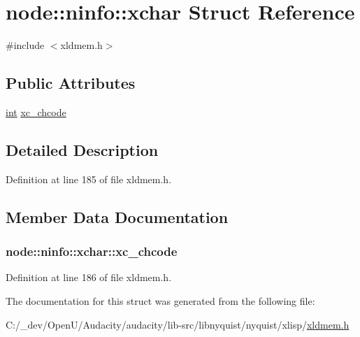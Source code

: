 \hypertarget{structnode_1_1ninfo_1_1xchar}{}\section{node\+:\+:ninfo\+:\+:xchar Struct Reference}
\label{structnode_1_1ninfo_1_1xchar}


{\ttfamily \#include $<$xldmem.\+h$>$}

\subsection*{Public Attributes}
\begin{DoxyCompactItemize}
\item 
\hyperlink{xmltok_8h_a5a0d4a5641ce434f1d23533f2b2e6653}{int} \hyperlink{structnode_1_1ninfo_1_1xchar_a3418c8203812bc06ba441fbae9c3398f}{xc\+\_\+chcode}
\end{DoxyCompactItemize}


\subsection{Detailed Description}


Definition at line 185 of file xldmem.\+h.



\subsection{Member Data Documentation}
\subsubsection[{\texorpdfstring{xc\+\_\+chcode}{xc_chcode}}]{ node\+::ninfo\+::xchar\+::xc\+\_\+chcode}\hypertarget{structnode_1_1ninfo_1_1xchar_a3418c8203812bc06ba441fbae9c3398f}{}\label{structnode_1_1ninfo_1_1xchar_a3418c8203812bc06ba441fbae9c3398f}


Definition at line 186 of file xldmem.\+h.



The documentation for this struct was generated from the following file\+:\begin{DoxyCompactItemize}
\item 
C\+:/\+\_\+dev/\+Open\+U/\+Audacity/audacity/lib-\/src/libnyquist/nyquist/xlisp/\hyperlink{xldmem_8h}{xldmem.\+h}\end{DoxyCompactItemize}
